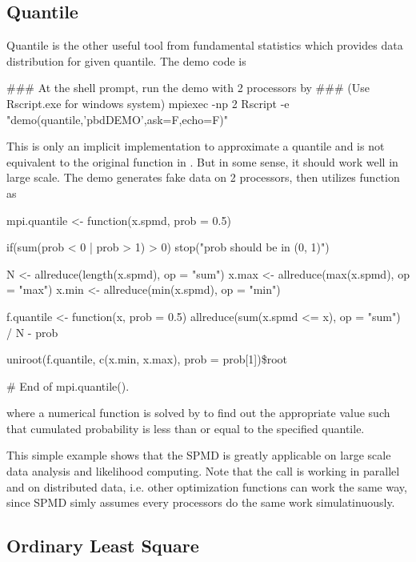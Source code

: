 \subsection[Quantile]{Quantile}
\label{sec:quantile}

Quantile is the other useful tool from fundamental statistics
which provides data distribution for given quantile.
The demo code is
\begin{Command}
### At the shell prompt, run the demo with 2 processors by
### (Use Rscript.exe for windows system)
mpiexec -np 2 Rscript -e "demo(quantile,'pbdDEMO',ask=F,echo=F)"
\end{Command}

This is only an implicit implementation to approximate a quantile
and is not equivalent to the original  function in
. But in some sense, it should work well in large scale.
The demo  generates fake data on 2 processors, then
utilizes  function as
\begin{Code}[title=R Code]
mpi.quantile <- function(x.spmd, prob = 0.5){
  if(sum(prob < 0 | prob > 1) > 0){
    stop("prob should be in (0, 1)")
  }

  N <- allreduce(length(x.spmd), op = "sum")
  x.max <- allreduce(max(x.spmd), op = "max")
  x.min <- allreduce(min(x.spmd), op = "min")

  f.quantile <- function(x, prob = 0.5){
    allreduce(sum(x.spmd <= x), op = "sum") / N - prob
  }

  uniroot(f.quantile, c(x.min, x.max), prob = prob[1])\$root
} # End of mpi.quantile().
\end{Code}
where a numerical function is solved by  to find out
the appropriate value such that cumulated probability is less than
or equal to the specified quantile.

This simple example shows that the SPMD is greatly applicable on large
scale data analysis and likelihood computing.
Note that the  call is working in parallel and on distributed
data, i.e. other optimization functions can work the same way,
since SPMD simly assumes every processors do the same work
simulatinuously.




\subsection[Ordinary Least Square]{Ordinary Least Square}
\label{sec:ols}

